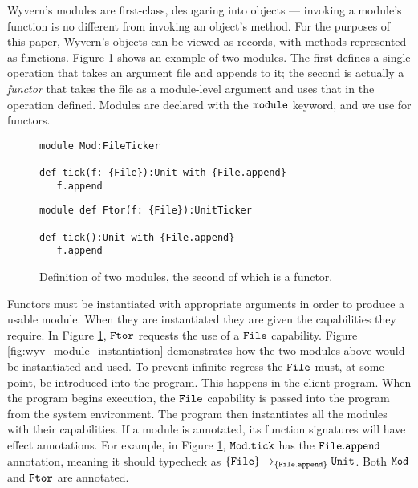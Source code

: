 Wyvern's modules are first-class, desugaring into objects --- invoking a module's function is no different from invoking an object's method.
For the purposes of this paper, Wyvern's objects can be viewed as records, with methods represented as functions.
Figure \ref{fig:wyv_modules} shows an example of two modules.
The first defines a single operation  that takes an argument file and appends to it; the second is actually a \textit{functor} that takes the file as a module-level argument and uses that in the operation defined.
Modules are declared with the $\mathtt{module}$ keyword, and we use  for functors.

\begin{figure}[h]

\begin{lstlisting}
module Mod:FileTicker

def tick(f: {File}):Unit with {File.append}
   f.append

\end{lstlisting}

\begin{lstlisting}
module def Ftor(f: {File}):UnitTicker

def tick():Unit with {File.append}
   f.append
\end{lstlisting}

\caption{Definition of two modules, the second of which is a functor.}
\label{fig:wyv_modules}
\end{figure}

Functors must be instantiated with appropriate arguments in order to produce a usable module.
When they are instantiated they are given the capabilities they require.
In Figure \ref{fig:wyv_modules}, $\mathtt{Ftor}$ requests the use of a $\mathtt{File}$ capability.
Figure \ref{fig:wyv_module_instantiation} demonstrates how the two modules above would be instantiated and used. To prevent infinite regress the $\mathtt{File}$ must, at some point, be introduced into the program. This happens in the client program. When the program begins execution, the $\mathtt{File}$ capability is passed into the program from the system environment. The program then instantiates all the modules with their capabilities. If a module is annotated, its function signatures will have effect annotations. For example, in Figure \ref{fig:wyv_modules}, $\mathtt{Mod.tick}$ has the $\mathtt{File.append}$ annotation, meaning it should typecheck as $\mathtt{ \{ File \} \rightarrow_{\{\mathtt{File.append}\}} \mathtt{Unit} }$. Both $\mathtt{Mod}$ and $\mathtt{Ftor}$ are annotated. 


